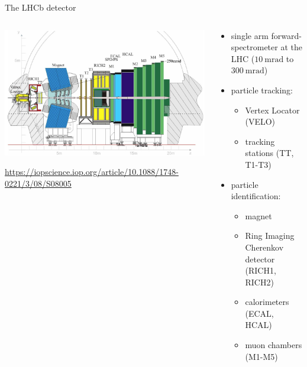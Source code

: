 \documentclass[aspectratio=1610, 10pt]{beamer}
\begin{document}
\begin{frame}{The LHCb detector}
  \begin{columns}
    \begin{column}{0.6\textwidth}
      \centering
      \includegraphics[width=\textwidth]{images/lhcb_detector.png}

      \tiny \url{https://iopscience.iop.org/article/10.1088/1748-0221/3/08/S08005}
    \end{column}
    \begin{column}{0.4\textwidth}
      \begin{itemize}
        \item single arm forward-spectrometer at the LHC ($\qty{10}{\milli \radian}$ to $\qty{300}{\milli \radian}$)
        \item particle tracking: 
        \begin{itemize}
          \item Vertex Locator (VELO)
          \item tracking stations (TT, T1-T3)
        \end{itemize}
        \item particle identification: 
        \begin{itemize}
          \item magnet
          \item Ring Imaging Cherenkov detector (RICH1, RICH2)
          \item calorimeters (ECAL, HCAL)
          \item muon chambers (M1-M5)
        \end{itemize}
      \end{itemize}
    \end{column}
  \end{columns}
\end{frame}
\end{document}
